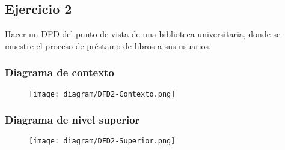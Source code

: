 \documentclass{templateNote}
\begin{document}
\newpage
\subsection{Ejercicio 2}
Hacer un DFD del punto de vista de una biblioteca universitaria, donde se muestre el proceso de préstamo de libros a sus usuarios.
\subsubsection{Diagrama de contexto}
\begin{figure}[H]
    \centering
    \texttt{[image: diagram/DFD2-Contexto.png]}
\end{figure}

\subsubsection{Diagrama de nivel superior}
\begin{figure}[H]
    \centering
    \texttt{[image: diagram/DFD2-Superior.png]}
\end{figure}
\end{document}

